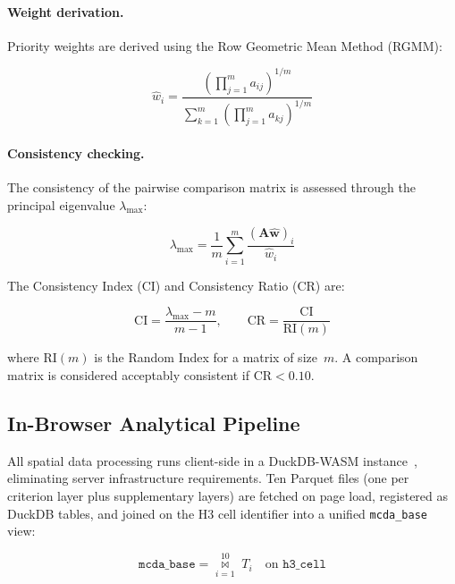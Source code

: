 \paragraph{Weight derivation.}
Priority weights are derived using the Row Geometric Mean Method (RGMM):

\begin{equation}
\label{eq:ahp-weights}
\hat{w}_i = \frac{\left(\prod_{j=1}^{m} a_{ij}\right)^{1/m}}{\sum_{k=1}^{m} \left(\prod_{j=1}^{m} a_{kj}\right)^{1/m}}
\end{equation}

\paragraph{Consistency checking.}
The consistency of the pairwise comparison matrix is assessed through the principal eigenvalue $\lambda_{\max}$:

\begin{equation}
\lambda_{\max} = \frac{1}{m} \sum_{i=1}^{m} \frac{(\mathbf{A} \hat{\mathbf{w}})_i}{\hat{w}_i}
\end{equation}

\noindent The Consistency Index (CI) and Consistency Ratio (CR) are:

\begin{equation}
\text{CI} = \frac{\lambda_{\max} - m}{m - 1}, \qquad
\text{CR} = \frac{\text{CI}}{\text{RI}(m)}
\end{equation}

\noindent where $\text{RI}(m)$ is the Random Index for a matrix of size~$m$. A comparison matrix is considered acceptably consistent if $\text{CR} < 0.10$.

\subsection{In-Browser Analytical Pipeline}
\label{sec:data-pipeline}

All spatial data processing runs client-side in a DuckDB-WASM instance~\cite{duckdb2019,duckdbwasm2022}, eliminating server infrastructure requirements. Ten Parquet files (one per criterion layer plus supplementary layers) are fetched on page load, registered as DuckDB tables, and joined on the H3 cell identifier into a unified \texttt{mcda\_base} view:

\begin{equation}
\texttt{mcda\_base} = \underset{i=1}{\overset{10}{\bowtie}} \; T_i \quad \text{on } \texttt{h3\_cell}
\end{equation}

